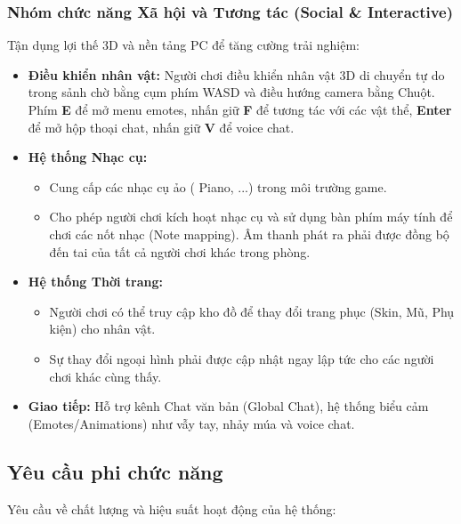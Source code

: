 \subsubsection{Nhóm chức năng Xã hội và Tương tác (Social \& Interactive)}
Tận dụng lợi thế 3D và nền tảng PC để tăng cường trải nghiệm:
\begin{itemize}
    \item \textbf{Điều khiển nhân vật:} Người chơi điều khiển nhân vật 3D di chuyển tự do trong sảnh chờ bằng cụm phím WASD và điều hướng camera bằng Chuột. Phím \textbf{E} để mở menu emotes, nhấn giữ \textbf{F} để tương tác với các vật thể, \textbf{Enter} để mở hộp thoại chat, nhấn giữ \textbf{V} để voice chat.
    \item \textbf{Hệ thống Nhạc cụ:}
        \begin{itemize}
            \item Cung cấp các nhạc cụ ảo ( Piano, ...) trong môi trường game.
            \item Cho phép người chơi kích hoạt nhạc cụ và sử dụng bàn phím máy tính để chơi các nốt nhạc (Note mapping). Âm thanh phát ra phải được đồng bộ đến tai của tất cả người chơi khác trong phòng.
        \end{itemize}
    \item \textbf{Hệ thống Thời trang:}
        \begin{itemize}
            \item Người chơi có thể truy cập kho đồ để thay đổi trang phục (Skin, Mũ, Phụ kiện) cho nhân vật.
            \item Sự thay đổi ngoại hình phải được cập nhật ngay lập tức cho các người chơi khác cùng thấy.
        \end{itemize}
    \item \textbf{Giao tiếp:} Hỗ trợ kênh Chat văn bản (Global Chat), hệ thống biểu cảm (Emotes/Animations) như vẫy tay, nhảy múa và voice chat.
\end{itemize}
\subsection{Yêu cầu phi chức năng}
Yêu cầu về chất lượng và hiệu suất hoạt động của hệ thống:

